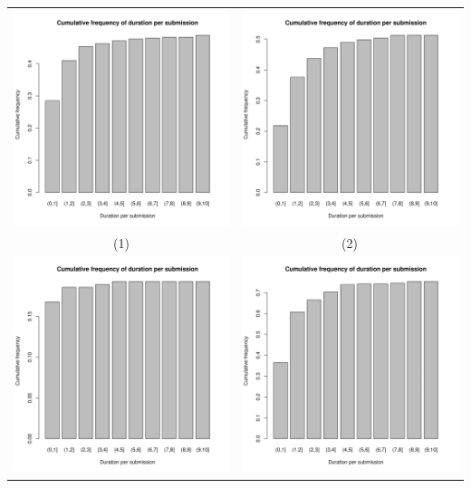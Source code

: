 \documentclass[a4paper]{article}
\theoremstyle{definition}
\begin{document}
\begin{enumerate}[a)]
\begin{itemize}
\begin{center}
\begin{tabular}{c c}
                 \includegraphics[width = 6.9cm]{Images/img4-6-1.png} & 
                 \includegraphics[width = 6.9cm]{Images/img4-6-2.png} \\
                 (1) & (2) \\
                 \includegraphics[width = 6.9cm]{Images/img4-6-3.png} &
                 \includegraphics[width = 6.9cm]{Images/img4-6-4.png} \\

\end{tabular}
\end{center}
\end{itemize}
\end{enumerate}
\end{document}
